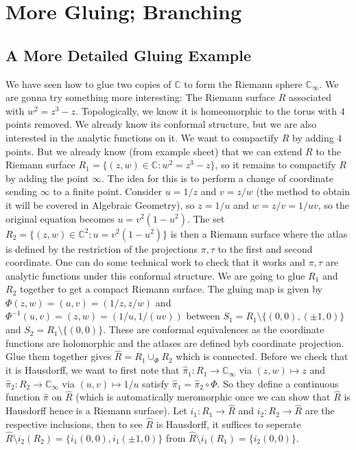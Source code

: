 \section{More Gluing; Branching}
\subsection{A More Detailed Gluing Example}
We have seen how to glue two copies of $\mathbb C$ to form the Riemann sphere $\mathbb C_\infty$.
We are gonna try something more interesting:
The Riemann surface $R$ associated with $w^2=z^3-z$.
Topologically, we know it is homeomorphic to the torus with $4$ points removed.
We already know its conformal structure, but we are also interested in the analytic functions on it.
We want to compactify $R$ by adding $4$ points.
But we already know (from example sheet) that we can extend $R$ to the Riemann surface $R_1=\{(z,w)\in\mathbb C:w^2=z^3-z\}$, so it remains to compactify $R$ by adding the point $\infty$.
The idea for this is to perform a change of coordinate sending $\infty$ to a finite point.
Consider $u=1/z$ and $v=z/w$ (the method to obtain it will be covered in Algebraic Geometry), so $z=1/u$ and $w=z/v=1/{uv}$, so the original equation becomes $u=v^2(1-u^2)$.
The set $R_2=\{(z,w)\in\mathbb C^2:u=v^2(1-u^2)\}$ is then a Riemann surface where the atlas is defined by the restriction of the projections $\pi,\tau$ to the first and second coordinate.
One can do some technical work to check that it works and $\pi,\tau$ are analytic functions under this conformal structure.
We are going to glue $R_1$ and $R_2$ together to get a compact Riemann surface.
The gluing map is given by $\Phi(z,w)=(u,v)=(1/z,z/w)$ and $\Phi^{-1}(u,v)=(z,w)=(1/u,1/(uv))$ between $S_1=R_1\setminus\{(0,0),(\pm 1,0)\}$ and $S_2=R_1\setminus\{(0,0)\}$.
These are conformal equivalences as the coordinate functions are holomorphic and the atlases are defined byb coordinate projection.
Glue them together gives $\hat{R}=R_1\cup_\Phi R_2$ which is connected.
Before we check that it is Hausdorff, we want to first note that $\hat\pi_1:R_1\to\mathbb C_\infty$ via $(z,w)\mapsto z$ and $\hat{\pi}_2:R_2\to\mathbb C_\infty$ via $(u,v)\mapsto 1/u$ satisfy $\hat\pi_1=\hat\pi_2\circ\Phi$.
So they define a continuous function $\hat\pi$ on $\hat{R}$ (which is automatically meromorphic once we can show that $\hat{R}$ is Hausdorff hence is a Riemann surface).
Let $i_1:R_1\to\hat{R}$ and $i_2:R_2\to\hat{R}$ are the respective inclusions, then to see $\hat{R}$ is Hausdorff, it suffices to seperate $\hat{R}\setminus i_2(R_2)=\{i_1(0,0),i_1(\pm 1,0)\}$ from $\hat{R}\setminus i_1(R_1)=\{i_2(0,0)\}$.
